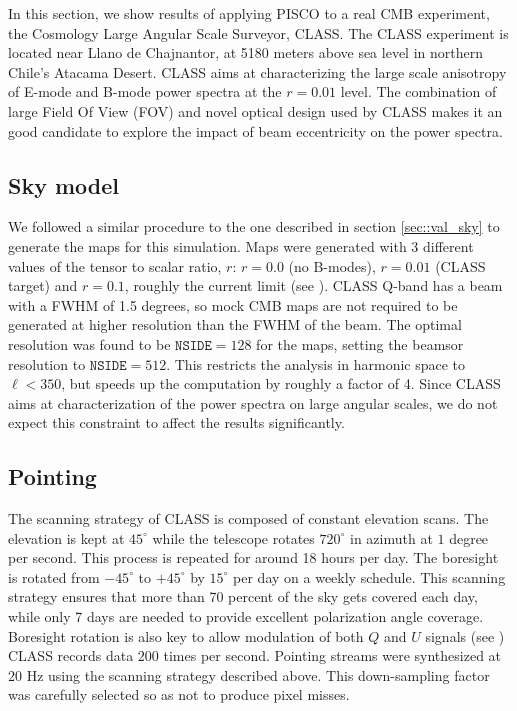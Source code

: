 \documentclass[a4paper,11pt]{article}
\begin{document}
In this section, we show results of applying PISCO to a real CMB experiment, the Cosmology Large Angular Scale Surveyor, CLASS. The CLASS experiment is located near Llano de Chajnantor, at 5180 meters above sea level in northern Chile's Atacama Desert. CLASS aims at characterizing the large scale anisotropy of E-mode and B-mode power spectra at the $r=0.01$ level. The combination of large Field Of View (FOV) and novel optical design used by CLASS makes it an good candidate to explore the impact of beam eccentricity on the power spectra. 

\subsection{Sky model}

We followed a similar procedure to the one described in section \ref{sec::val_sky} to generate the maps for this simulation. Maps were generated with 3 different values of the tensor to scalar ratio, $r$: $r=0.0$ (no B-modes), $r=0.01$ (CLASS target) and $r=0.1$, roughly the current limit (see \cite{2018PhRvL.121v1301B}). CLASS Q-band has a beam with a FWHM of 1.5 degrees, so mock CMB maps are not required to be generated at higher resolution than the FWHM of the beam. The optimal resolution was found to be $\mathrm{\texttt{NSIDE}} = 128$ for the maps, setting the beamsor resolution to $\mathrm{\texttt{NSIDE}} = 512$. This restricts the analysis in harmonic space to $\ell < 350$, but speeds up the computation by roughly a factor of 4. Since CLASS aims at characterization of the power spectra on large angular scales, we do not expect this constraint to affect the results significantly.

\subsection{Pointing}

The scanning strategy of CLASS is composed of constant elevation scans. The elevation is kept at $45^{\circ}$ while the telescope rotates $720^\circ$ in azimuth at $1$ degree per second. This process is repeated for around 18 hours per day. The boresight is rotated from $-45^{\circ}$ to $+45^{\circ}$ by $15^{\circ}$ per day on a weekly schedule. This scanning strategy ensures that more than 70 percent of the sky gets covered each day, while only 7 days are needed to provide excellent polarization angle coverage. Boresight rotation is also key to allow modulation of both $Q$ and $U$ signals (see \cite{2016SPIE.9914E..1KH}) CLASS records data $200$ times per second. Pointing streams were synthesized at $20$ Hz using the scanning strategy described above. This down-sampling factor was carefully selected so as not to produce pixel misses. 
\end{document}
